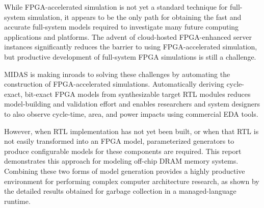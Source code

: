 While FPGA-accelerated simulation is not yet a standard technique for
full-system simulation, it appears to be the only path for obtaining the fast
and accurate full-system models required to investigate many future computing
applications and platforms. The advent of cloud-hosted FPGA-enhanced server
instances significantly reduces the barrier to using FPGA-accelerated
simulation, but productive development of full-system FPGA simulations is still
a challenge.

MIDAS is making inroads to solving these challenges by automating the
construction of FPGA-accelerated simulations. Automatically deriving
cycle-exact, bit-exact FPGA models from synthesizable target RTL modules
reduces model-building and validation effort and enables researchers and system
designers to also observe cycle-time, area, and power impacts using commercial
EDA tools.

However, when RTL implementation has not yet been built, or when that RTL is
not easily transformed into an FPGA model, parameterized generators to produce
configurable models for these components are required. This report demonstrates
this approach for modeling off-chip DRAM memory systems. Combining these two forms
of model generation provides a highly productive environment for performing
complex computer architecture research, as shown by the detailed results
obtained for garbage collection in a managed-language runtime.
